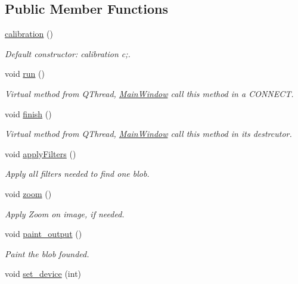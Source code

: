 \subsection*{Public Member Functions}
\begin{DoxyCompactItemize}
\item 
\hyperlink{classcalibration_a00cd91462ef148dad0e44c5d644861ea}{calibration} ()
\begin{DoxyCompactList}\small\item\em Default constructor\+: calibration c;. \end{DoxyCompactList}\item 
void \hyperlink{classcalibration_a4b435b278f024e919b733627884ba0d2}{run} ()
\begin{DoxyCompactList}\small\item\em Virtual method from Q\+Thread, \hyperlink{classMainWindow}{Main\+Window} call this method in a C\+O\+N\+N\+E\+CT. \end{DoxyCompactList}\item 
void \hyperlink{classcalibration_a01c20860fb99a2370c191b0228e82af4}{finish} ()\hypertarget{classcalibration_a01c20860fb99a2370c191b0228e82af4}{}\label{classcalibration_a01c20860fb99a2370c191b0228e82af4}

\begin{DoxyCompactList}\small\item\em Virtual method from Q\+Thread, \hyperlink{classMainWindow}{Main\+Window} call this method in its destrcutor. \end{DoxyCompactList}\item 
void \hyperlink{classcalibration_a17edbce9454069eaa50cc84aa1cb34fd}{apply\+Filters} ()
\begin{DoxyCompactList}\small\item\em Apply all filters needed to find one blob. \end{DoxyCompactList}\item 
void \hyperlink{classcalibration_af2cc271619bd9d5c0e72ebbbf1b83f39}{zoom} ()
\begin{DoxyCompactList}\small\item\em Apply Zoom on image, if needed. \end{DoxyCompactList}\item 
void \hyperlink{classcalibration_a9d29a622f2412fcf5cb654444d1bd43e}{paint\+\_\+output} ()
\begin{DoxyCompactList}\small\item\em Paint the blob founded. \end{DoxyCompactList}\item 
void \hyperlink{classcalibration_adba399584f906544ce09309e5539bb84}{set\+\_\+device} (int)\hypertarget{classcalibration_adba399584f906544ce09309e5539bb84}{}\label{classcalibration_adba399584f906544ce09309e5539bb84}


\end{DoxyCompactItemize}

